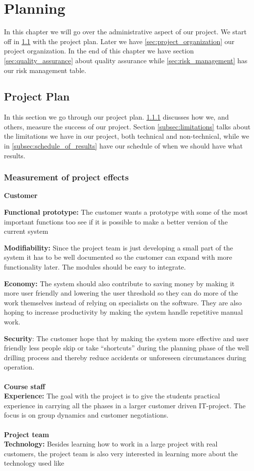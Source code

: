 \documentclass{report}
\begin{document}
\chapter{Planning} \label{cha:planning}
In this chapter we will go over the administrative aspect of our project. We start off in \ref{sec:project_plan} with the project plan. Later we have \ref{sec:project_organization} our project organization. In the end of this chapter we have section \ref{sec:quality_assurance} about quality assurance while \ref{sec:risk_management} has our risk management table.

\newpage
\section{Project Plan} \label{sec:project_plan}
In this section we  go through our project plan. \ref{subsec:measurement_of_project_effects} discusses how we, and others, measure the success of our project. Section \ref{subsec:limitations} talks about the limitations we have in our project, both technical and non-technical, while we in \ref{subsec:schedule_of_results} have our schedule of when we should have what results.
\subsection{Measurement of project effects} \label{subsec:measurement_of_project_effects}
\textbf{Customer}

\textbf{Functional prototype:} The customer wants a prototype with some of the most important functions too see if it is possible to make a better version of the current system

\textbf{Modifiability:} Since the project team is just developing a small part of the system it has to be well documented so the customer can expand with more functionality later. The modules should be easy to integrate.

\textbf{Economy:} The system should also contribute to saving money by making it more user friendly and lowering the user threshold so they can do more of the work themselves instead of relying on specialists on the software. They are also hoping to increase productivity by making the system handle repetitive manual work. 

\textbf{Security}: The customer hope that by making the system more effective and user friendly less people skip or take “shortcuts” during the planning phase of the well drilling process and thereby reduce accidents or unforeseen circumstances during operation.\\ \\
\textbf{Course staff}\\
\textbf{Experience:} The goal with the project is to give the students practical experience in carrying all the phases in a larger customer driven IT-project. The focus is on group dynamics and customer negotiations.\\ \\
\textbf{Project team}\\
\textbf{Technology:} Besides learning how to work in a large project with real customers, the project team is also very interested in learning more about the technology used like 
 
\end{document}
